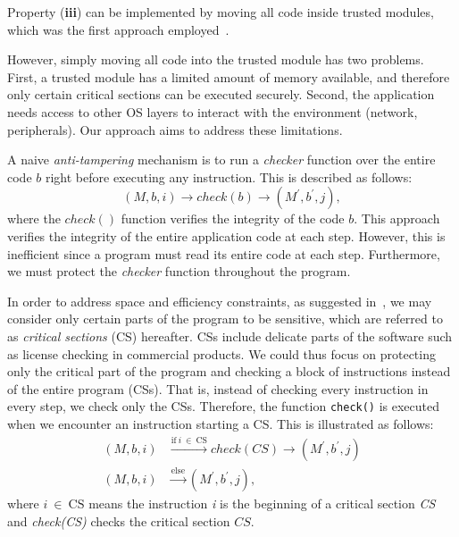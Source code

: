 Property (\textbf{iii}) can be implemented by moving all code inside trusted 
modules, which was the first approach 
employed~\cite{baumann2015shielding,arnautov2016scone,tsai2017graphene}.

However, simply moving all code into the trusted module has two problems.
First, a trusted module has a limited amount of memory available, and therefore 
only
certain critical sections can be executed securely.
Second, the application needs access to other OS layers to interact with the 
environment (network, peripherals).
Our approach aims to address these limitations.

A naive \emph{anti-tampering} mechanism is to run a \emph{checker} function 
over the entire code $b$ right before executing any instruction. This is 
described as follows:
\[ (M,b,i) \rightarrow check(b) \rightarrow (M^\prime,b^\prime,j), \]
where the $check()$ function verifies the integrity of the code $b$.
This approach verifies the integrity of the entire application code at each 
step. However, this is inefficient since a program must read its entire code at 
each step. Furthermore, we must protect the \emph{checker} function throughout 
the program.

In order to address space and efficiency constraints, as suggested 
in~\cite{brumley2004privtrans,singaravelu2006reducing,smith2006refactoring}, we 
may consider only certain parts of the program to be sensitive, which are 
referred to as \emph{critical sections} (CS) hereafter.
CSs include delicate parts of the software such as license checking in 
commercial products. We could thus focus on protecting only the critical part 
of the program and checking a block of instructions instead of the entire 
program (\ie CSs).
That is, instead of checking every instruction in every step, we check only the 
CSs.
Therefore, the function \texttt{check()} is executed when we encounter an 
instruction starting a CS.
This is illustrated as follows:
\begin{align}
	(M,b,i) & \xrightarrow{\text{if}~i~\in~\text{CS}} check(CS) \rightarrow 
	(M^\prime,b^\prime,j) \nonumber \\
	(M,b,i) & \xrightarrow{\text{else}} (M^\prime,b^\prime,j), \nonumber
\end{align}
where $i~\in~\text{CS}$ means the instruction \emph{i} is the beginning of a 
critical section \emph{CS} and \emph{check(CS)} checks the critical section 
$CS$.

